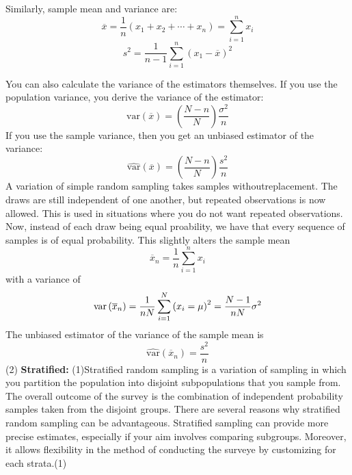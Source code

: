 \documentclass[12pt,twoside]{reedthesis}
\begin{document}
Similarly, sample mean and variance are:
\[
\overline{x} = \frac{1}{n} \left(x_1 + x_2 + \cdots + x_n \right) = \sum_{i=1}^{n}x_i 
\]
\[
s^2 = \frac{1}{n-1} \sum^n_{i=1} \left( x_1 - \overline{x} \right)^2
\]

You can also calculate the variance of the estimators themselves. If you use the population variance, you derive the variance of the estimator:
\[
\text{var}\left(\overline{x}\right) = \left(\frac{N-n}{N}\right)\frac{\sigma^2}{n} 
\]
If you use the sample variance, then you get an unbiased estimator of the variance:
\[
\widehat{\text{var}}\left(\overline{x}\right) = \left(\frac{N-n}{N}\right)\frac{s^2}{n}
\]
A variation of simple random sampling takes samples withoutreplacement. The draws are still independent of one another, but repeated observations is now allowed. This is used in situations where you do not want repeated observations. Now, instead of each draw being equal proability, we have that every sequence of samples is of equal probability. This slightly alters the sample mean
\[
\overline{x}_n = \frac{1}{n}\sum^n_{i=1}x_i
\]
with a variance of
\[
\text{var}\left(\overline{x}_n\right) = \frac{1}{n\space N} \sum_{i=1}^N\left(x_i = \mu\right)^2 = \frac{N-1}{n\space N}\sigma^2
\]
The unbiased estimator of the variance of the sample mean is
\[
\widehat{\text{var}} \left( \overline{x}_n \right) = \frac{s^2}{n}
\]
(2)
\textbf{Stratified:}
(1)Stratified random sampling is a variation of sampling in which you partition the population into disjoint subpopulations that you sample from. The overall outcome of the survey is the combination of independent probability samples taken from the disjoint groups. There are several reasons why stratified random sampling can be advantageous. Stratified sampling can provide more precise estimates, especially if your aim involves comparing subgroups. Moreover, it allows flexibility in the method of conducting the surveye by customizing for each strata.(1)
\end{document}
